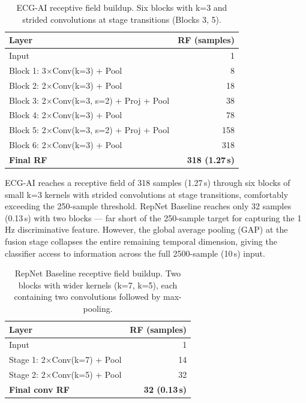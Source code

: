 \documentclass[sigconf,nonacm]{acmart}
\begin{document}
\begin{table}[H]
\centering
\caption{ECG-AI receptive field buildup. Six blocks with k=3 and strided convolutions at stage transitions (Blocks 3, 5).}
\label{tab:rf-ecgai}
\small
\begin{tabular}{lr}
\toprule
\textbf{Layer} & \textbf{RF (samples)} \\
\midrule
Input & 1 \\
Block 1: 3$\times$Conv(k=3) + Pool & 8 \\
Block 2: 2$\times$Conv(k=3) + Pool & 18 \\
Block 3: 2$\times$Conv(k=3, s=2) + Proj + Pool & 38 \\
Block 4: 2$\times$Conv(k=3) + Pool & 78 \\
Block 5: 2$\times$Conv(k=3, s=2) + Proj + Pool & 158 \\
Block 6: 2$\times$Conv(k=3) + Pool & 318 \\
\midrule
\textbf{Final RF} & \textbf{318 (1.27\,s)} \\
\bottomrule
\end{tabular}
\end{table}

ECG-AI reaches a receptive field of 318 samples (1.27\,s) through six blocks of small k=3 kernels with strided convolutions at stage transitions, comfortably exceeding the 250-sample threshold. RepNet Baseline reaches only 32 samples (0.13\,s) with two blocks --- far short of the 250-sample target for capturing the 1\,Hz discriminative feature. However, the global average pooling (GAP) at the fusion stage collapses the entire remaining temporal dimension, giving the classifier access to information across the full 2500-sample (10\,s) input.


\begin{table}[H]
\centering
\caption{RepNet Baseline receptive field buildup. Two blocks with wider kernels (k=7, k=5), each containing two convolutions followed by max-pooling.}
\label{tab:rf-repnet}
\small
\begin{tabular}{lr}
\toprule
\textbf{Layer} & \textbf{RF (samples)} \\
\midrule
Input & 1 \\
Stage 1: 2$\times$Conv(k=7) + Pool & 14 \\
Stage 2: 2$\times$Conv(k=5) + Pool & 32 \\
\midrule
\textbf{Final conv RF} & \textbf{32 (0.13\,s)} \\
\bottomrule
\end{tabular}
\end{table}
\end{document}
